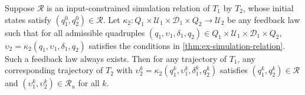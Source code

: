 \begin{lemma}
  \label{thm:ex-simulation-tracking}
  Suppose $\mathcal{R}$ is an input-constrained simulation relation of $T_{1}$ by $T_{2}$, whose initial states satisfy $(q_{1}^{0}, q_{2}^{0}) \in \mathcal{R}$.
  Let $\kappa_{2}: Q_{1} \times \mathcal{U}_{1} \times \mathcal{D}_{1} \times Q_{2} \to \mathcal{U}_{2}$ be any feedback law such that for all admissible quadruples $(q_{1}, \upsilon_{1}, \delta_{1}, q_{2}) \in Q_{1} \times \mathcal{U}_{1} \times \mathcal{D}_{1} \times Q_{2}$, $\upsilon_{2} = \kappa_{2} (q_{1}, \upsilon_{1}, \delta_{1}, q_{2})$ satisfies the conditions in \cref{thm:ex-simulation-relation}.
  Such a feedback law always exists.
  Then for any trajectory of $T_{1}$, %
  any corresponding trajectory of $T_{2}$ with $\upsilon_{2}^{k} = \kappa_{2} (q_{1}^{k}, \upsilon_{1}^{k}, \delta_{1}^{k}, q_{2}^{k})$ satisfies $(q_{1}^{k}, q_{2}^{k}) \in \mathcal{R}$ and $(\upsilon_{1}^{k}, \upsilon_{2}^{k}) \in \mathcal{R}_{u}$ for all $k$.
\end{lemma}

